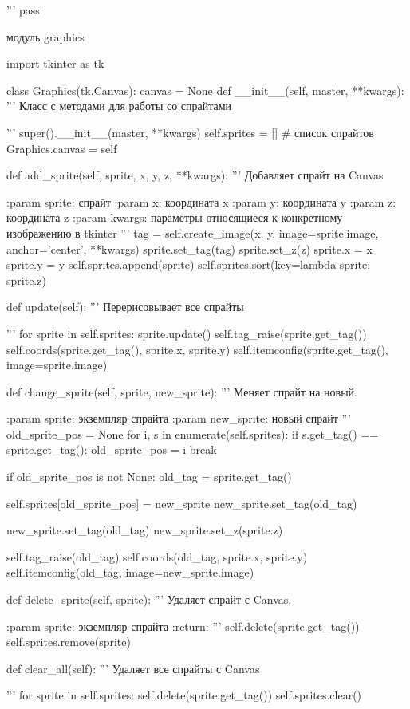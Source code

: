 '''
pass

модуль graphics

import tkinter as tk

class Graphics(tk.Canvas):
canvas = None
def \_\_init\_\_(self, master, **kwargs):
'''
Класс с методами для работы со спрайтами

'''
super().\_\_init\_\_(master, **kwargs)
self.sprites = []  # список спрайтов
Graphics.canvas = self

def add\_sprite(self, sprite, x, y, z, **kwargs):
'''
Добавляет спрайт на Canvas

:param sprite: спрайт
:param x: координата x
:param y: координата y
:param z: координата z
:param kwargs: параметры относящиеся к конкретному изображению в tkinter
'''
tag = self.create\_image(x, y, image=sprite.image, anchor='center', **kwargs)
sprite.set\_tag(tag)
sprite.set\_z(z)
sprite.x = x
sprite.y = y
self.sprites.append(sprite)
self.sprites.sort(key=lambda sprite: sprite.z)

def update(self):
'''
Перерисовывает все спрайты

'''
for sprite in self.sprites:
sprite.update()
self.tag\_raise(sprite.get\_tag())
self.coords(sprite.get\_tag(), sprite.x, sprite.y)
self.itemconfig(sprite.get\_tag(), image=sprite.image)


def change\_sprite(self, sprite, new\_sprite):
'''
Меняет  спрайт на новый.

:param sprite: экземпляр спрайта
:param new\_sprite: новый спрайт
'''
old\_sprite\_pos = None
for i, s in enumerate(self.sprites):
if s.get\_tag() == sprite.get\_tag():
old\_sprite\_pos = i
break

if old\_sprite\_pos is not None:
old\_tag = sprite.get\_tag()

self.sprites[old\_sprite\_pos] = new\_sprite
new\_sprite.set\_tag(old\_tag)

new\_sprite.set\_tag(old\_tag)
new\_sprite.set\_z(sprite.z)

self.tag\_raise(old\_tag)
self.coords(old\_tag, sprite.x, sprite.y)
self.itemconfig(old\_tag, image=new\_sprite.image)

def delete\_sprite(self, sprite):
'''
Удаляет спрайт с Canvas.

:param sprite: экземпляр спрайта
:return:
'''
self.delete(sprite.get\_tag())
self.sprites.remove(sprite)

def clear\_all(self):
'''
Удаляет все спрайты с Canvas

'''
for sprite in self.sprites:
self.delete(sprite.get\_tag())
self.sprites.clear()

